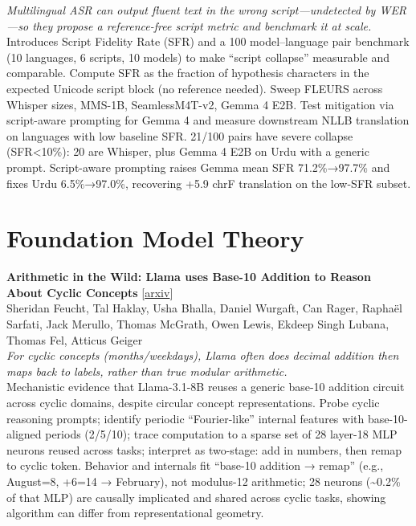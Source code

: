 \documentclass[12pt,letterpaper]{article}
\begin{document}
{\small\textit{Multilingual ASR can output fluent text in the wrong script---undetected by WER---so they propose a reference-free script metric and benchmark it at scale.}}\\[1pt]
{\footnotesize Introduces Script Fidelity Rate (SFR) and a 100 model--language pair benchmark (10 languages, 6 scripts, 10 models) to make ``script collapse'' measurable and comparable. Compute SFR as the fraction of hypothesis characters in the expected Unicode script block (no reference needed). Sweep FLEURS across Whisper sizes, MMS-1B, SeamlessM4T-v2, Gemma 4 E2B. Test mitigation via script-aware prompting for Gemma 4 and measure downstream NLLB translation on languages with low baseline SFR. 21/100 pairs have severe collapse (SFR<10\%): 20 are Whisper, plus Gemma 4 E2B on Urdu with a generic prompt. Script-aware prompting raises Gemma mean SFR 71.2\%→97.7\% and fixes Urdu 6.5\%→97.0\%, recovering +5.9 chrF translation on the low-SFR subset.}

\medskip


\section*{Foundation Model Theory}

{\small\textbf{Arithmetic in the Wild: Llama uses Base-10 Addition to Reason About Cyclic Concepts}} {\scriptsize[\href{https://arxiv.org/abs/2605.01148}{arxiv}]}\\
{\scriptsize Sheridan Feucht, Tal Haklay, Usha Bhalla, Daniel Wurgaft, Can Rager, Rapha\"el Sarfati, Jack Merullo, Thomas McGrath, Owen Lewis, Ekdeep Singh Lubana, Thomas Fel, Atticus Geiger}\\

{\small\textit{For cyclic concepts (months/weekdays), Llama often does decimal addition then maps back to labels, rather than true modular arithmetic.}}\\[1pt]
{\footnotesize Mechanistic evidence that Llama-3.1-8B reuses a generic base-10 addition circuit across cyclic domains, despite circular concept representations. Probe cyclic reasoning prompts; identify periodic ``Fourier-like'' internal features with base-10-aligned periods (2/5/10); trace computation to a sparse set of 28 layer-18 MLP neurons reused across tasks; interpret as two-stage: add in numbers, then remap to cyclic token. Behavior and internals fit ``base-10 addition → remap'' (e.g., August=8, +6=14 → February), not modulus-12 arithmetic; 28 neurons (\textasciitilde{}0.2\% of that MLP) are causally implicated and shared across cyclic tasks, showing algorithm can differ from representational geometry.}
\end{document}

